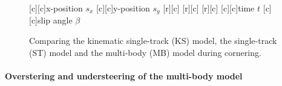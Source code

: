 \documentclass[11pt,a4paper]{article}
\renewcommand{\^}[1]{^{(#1)}}
\begin{document}
\begin{figure}[h!tb]	
    \centering	
    \footnotesize
      [c][c]{x-position $s_x$}
      [c][c]{y-position $s_y$}
      [r][c]{}
      [r][c]{}
      [r][c]{}
       \hspace{0.1cm}
      [c][c]{time $t$}
      [c][c]{slip angle $\beta$}

      \caption{Comparing the kinematic single-track (KS) model, the single-track (ST) model and the multi-body (MB) model during cornering.}
\end{figure}

\paragraph{Overstering and understeering of the multi-body model}
\end{document}
